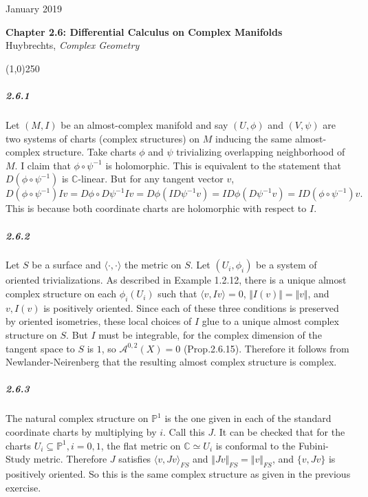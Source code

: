 \documentclass[10pt,letter]{article}
\begin{document}
\noindent 
January 2019
\begin{center}
\textbf{Chapter 2.6: Differential Calculus on Complex Manifolds}\\ Huybrechts, \textit{Complex Geometry}

\line(1,0){250}
\end{center}

\subparagraph{2.6.1} Let $(M,I)$ be an almost-complex manifold and say $(U,\phi)$ and $(V,\psi)$ are two systems of charts (complex structures) on $M$ inducing the same almost-complex structure. Take charts $\phi$ and $\psi$ trivializing overlapping neighborhood of $M$. I claim that $\phi \circ\psi^{-1}$ is holomorphic. This is equivalent to the statement that $D(\phi \circ \psi^{-1})$ is $\mathbb{C}$-linear. But for any tangent vector $v$,
\[ D(\phi \circ \psi^{-1})Iv = D\phi \circ D\psi^{-1} Iv =  D\phi (I D\psi^{-1} v) = I D \phi( D\psi^{-1}v) = I D(\phi \circ \psi^{-1})v.\]
This is because both coordinate charts are holomorphic with respect to $I$.

\subparagraph{2.6.2} Let $S$ be a surface and $\langle \cdot, \cdot \rangle$ the metric on $S$. Let $(U_i,\phi_i)$ be a system of oriented trivializations. As described in Example 1.2.12, there is a unique almost complex structure on each $\phi_i(U_i)$ such that $\langle v, Iv \rangle = 0$, $\Vert I(v) \Vert = \Vert v \Vert$, and $v, I(v)$ is positively oriented. Since each of these three conditions is preserved by oriented isometries, these local choices of $I$ glue to a unique almost complex structure on $S$. But $I$ must be integrable, for the complex dimension of the tangent space to $S$ is $1$, so $\mathcal{A}^{0,2}(X)= 0$ (Prop.2.6.15). Therefore it follows from Newlander-Neirenberg that the resulting almost complex structure is complex.

\subparagraph{2.6.3} The natural complex structure on $\mathbb{P}^1$ is the one given in each of the standard coordinate charts by multiplying by $i$. Call this $J$. It can be checked that for the charts $U_i \subseteq \mathbb{P}^1, i = 0,1$, the flat metric on $\mathbb{C} \simeq U_i$ is conformal to the Fubini-Study metric. Therefore $J$ satisfies $\langle v, Jv \rangle_{FS}$ and $\Vert Jv \Vert_{FS} = \Vert v \Vert_{FS}$, and $\lbrace v, Jv \rbrace$ is positively oriented. So this is the same complex structure as given in the previous exercise. 
\end{document}
